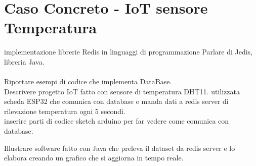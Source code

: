 \chapter{Caso Concreto - IoT sensore Temperatura}
implementazione librerie Redis in linguaggi di programmazione
Parlare di Jedis, libreria Java.\\\\


Riportare esempi di codice che implementa DataBase.\\
Descrivere progetto IoT fatto con sensore di temperatura DHT11.
utilizzata scheda ESP32 che comunica con database e manda dati a redis server di rilevazione temperatura ogni 5 secondi.\\
inserire parti di codice sketch arduino per far vedere come comunica con database.


Illustrare software fatto con Java che preleva il dataset da redis server e lo elabora creando un grafico che si aggiorna in tempo reale.
